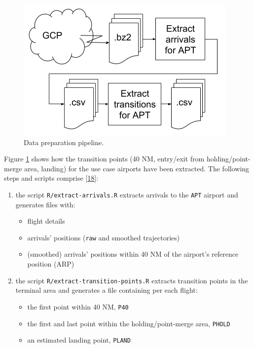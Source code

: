 \documentclass[conference,final,a4paper,]{IEEEtran}
\providecommand{\tightlist}{%
  \setlength{\itemsep}{0pt}\setlength{\parskip}{0pt}}
\begin{document}
\begin{figure}[htb]

{\centering \includegraphics[width=1\linewidth]{figures/data-preparation-pipeline} 

}

\caption{Data preparation pipeline.}\label{fig:data-preparation-pipeline}
\end{figure}

Figure \ref{fig:data-preparation-pipeline} shows how the transition points
(40 NM, entry/exit from holding/point-merge area, landing) for the use case airports
have been extracted.
The following steps and scripts comprise {[}\protect\hyperlink{ref-performancereviewunit_2019}{18}{]}:

\begin{enumerate}
\def\labelenumi{\arabic{enumi}.}
\item
  the script \texttt{R/extract-arrivals.R} extracts arrivals to the \texttt{APT} airport and generates files with:

  \begin{itemize}
  \tightlist
  \item
    flight details
  \item
    arrivals' positions (\texttt{raw} and smoothed trajectories)
  \item
    (smoothed) arrivals' positions within 40 NM of the airport's reference position (ARP)
  \end{itemize}
\item
  the script \texttt{R/extract-transition-points.R} extracts transition points in the terminal area
  and generates a file containing per each flight:

  \begin{itemize}
  \tightlist
  \item
    the first point within 40 NM, \texttt{P40}
  \item
    the first and last point within the holding/point-merge area, \texttt{PHOLD}
  \item
    an estimated landing point, \texttt{PLAND}
  \end{itemize}
\end{enumerate}
\end{document}
